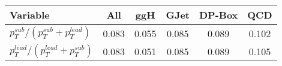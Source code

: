 \documentclass[a4paper,portrait]{article}
\begin{document}
\begin{center}
\begin{tabular}{| l || c | c | c | c | c |}
\hline
Variable & All & ggH & GJet & DP-Box & QCD \\ \hline
$p_{T}^{sub}/(p_{T}^{sub}+p_{T}^{lead})$ & 0.083 & 0.055 & 0.085 & 0.089 & 0.102 \\ 
$p_{T}^{lead}/(p_{T}^{lead}+p_{T}^{sub})$ & 0.083 & 0.051 & 0.085 & 0.089 & 0.105 \\ 
\hline
\end{tabular}
\end{center}
\end{document}
